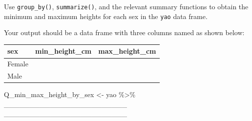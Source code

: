 \documentclass[
  letterpaper,
  DIV=11,
  numbers=noendperiod]{scrreprt}
\newenvironment{Shaded}{\begin{snugshade}}{\end{snugshade}}
\newcommand{\NormalTok}[1]{\textcolor[rgb]{0.00,0.23,0.31}{#1}}
\newcommand{\OtherTok}[1]{\textcolor[rgb]{0.00,0.23,0.31}{#1}}
\newcommand{\SpecialCharTok}[1]{\textcolor[rgb]{0.37,0.37,0.37}{#1}}
\begin{document}
\begin{tcolorbox}[enhanced jigsaw, colframe=quarto-callout-tip-color-frame, rightrule=.15mm, opacityback=0, breakable, coltitle=black, colbacktitle=quarto-callout-tip-color!10!white, bottomrule=.15mm, leftrule=.75mm, toprule=.15mm, arc=.35mm, bottomtitle=1mm, colback=white, left=2mm, opacitybacktitle=0.6, titlerule=0mm, title=\textcolor{quarto-callout-tip-color}{\faLightbulb}\hspace{0.5em}{Practice}, toptitle=1mm]

Use \texttt{group\_by()}, \texttt{summarize()}, and the relevant summary
functions to obtain the minimum and maximum heights for each sex in the
\texttt{yao} data frame.

Your output should be a data frame with three columns named as shown
below:

\begin{longtable}[]{@{}lll@{}}
\toprule\noalign{}
sex & min\_height\_cm & max\_height\_cm \\
\midrule\noalign{}
\endhead
\bottomrule\noalign{}
\endlastfoot
Female & & \\
Male & & \\
\end{longtable}

\begin{Shaded}
\begin{Highlighting}[]
\NormalTok{Q\_min\_max\_height\_by\_sex }\OtherTok{\textless{}{-}} 
\NormalTok{  yao }\SpecialCharTok{\%\textgreater{}\%} 
\NormalTok{  \_\_\_\_\_\_\_\_\_\_\_\_\_\_\_\_\_\_\_\_\_\_\_\_}
\NormalTok{  \_\_\_\_\_\_\_\_\_\_\_\_\_\_\_\_\_\_\_\_\_\_\_\_}
\end{Highlighting}
\end{Shaded}

\end{tcolorbox}
\end{document}
